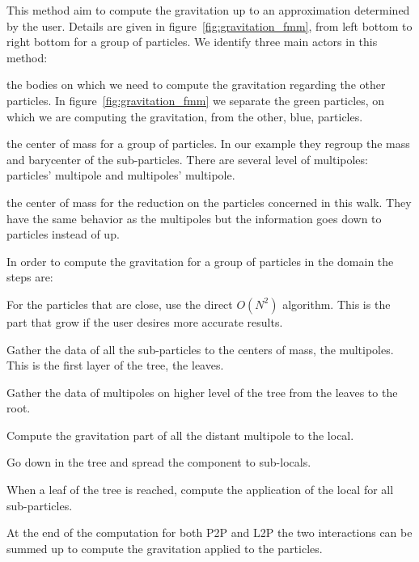 This method aim to compute the gravitation up to an approximation determined by the user. 
Details are given in figure~\ref{fig:gravitation_fmm}, from left bottom to right bottom for a group of particles.
We identify three main actors in this method: \\

\begin{description}
\item[Particles: ] the bodies on which we need to compute the gravitation regarding the other particles. 
In figure~\ref{fig:gravitation_fmm} we separate the green particles, on which we are computing the gravitation, from the other, blue, particles. 
\item[Multipoles: ] the center of mass for a group of particles.
In our example they regroup the mass and barycenter of the sub-particles. 
There are several level of multipoles: particles' multipole and multipoles' multipole.
\item[Locals: ] the center of mass for the reduction on the particles concerned in this walk. 
They have the same behavior as the multipoles but the information goes down to particles instead of up.\\ 
\end{description}

In order to compute the gravitation for a group of particles in the domain the steps are: \\

\begin{description}
	\item[Particles to Particles (P2P): ] For the particles that are close, use the direct $O(N^2)$ algorithm.  
	This is the part that grow if the user desires more accurate results. 
	\item[Particles to Multipoles (P2M): ] Gather the data of all the sub-particles to the centers of mass, the multipoles.
	This is the first layer of the tree, the leaves. 
	\item[Multipoles to Multipole (M2M): ] Gather the data of multipoles on higher level of the tree from the leaves to the root. 
	\item[Multipoles to Local (M2L): ] Compute the gravitation part of all the distant multipole to the local. 
	\item[Local to Local (L2L): ] Go down in the tree and spread the component to sub-locals.
	\item[Local to Particles (L2P): ] When a leaf of the tree is reached, compute the application of the local for all sub-particles. 
	\item[Summation: ] At the end of the computation for both P2P and L2P the two interactions can be summed up to compute the gravitation applied to the particles. \\
\end{description}

